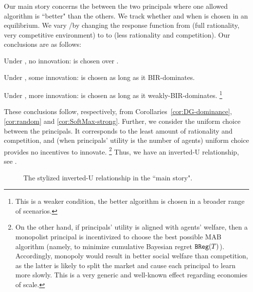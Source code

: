 Our main story concerns the \FiniteGame between the two principals where one allowed algorithm \alg is ``better" than the others. {We track whether and when \alg is chosen in an equilibrium.} We vary \competitiveness/\rationality by changing the response function from \HardMax (full rationality, very competitive environment) to \HardMaxRandom to  \SoftMaxRandom (less rationality and competition). Our conclusions are as follows:
\begin{OneLiners}
\item Under \HardMax, no innovation: \DynGreedy is chosen over \alg.
\item Under \HardMaxRandom, some innovation:  \alg is chosen as long as it BIR-dominates.
\item Under \SoftMaxRandom, more innovation: \alg is chosen as long as it weakly-BIR-dominates.%
\footnote{This is a weaker condition, the better algorithm is chosen in a broader range of scenarios.}
\end{OneLiners}
These conclusions follow, respectively, from Corollaries~\ref{cor:DG-dominance}, \ref{cor:random} and \ref{cor:SoftMax-strong}. Further, {we consider the uniform choice between the principals. It corresponds to the least amount of rationality and competition, and (when principals' utility is the number of agents) uniform choice provides no incentives to innovate.}%
\footnote{On the other hand, if principals' utility is aligned with agents' welfare, then a monopolist principal is incentivized to choose the best possible MAB algorithm (namely, to minimize cumulative Bayesian regret $\mathtt{BReg}(T)$). Accordingly, monopoly would result in better social welfare than competition, as the latter is likely to split the market and cause each principal to learn more slowly. This is a very generic and well-known effect regarding economies of scale.}
Thus, we have an inverted-U relationship, see .


\begin{figure}[t]
\begin{center}

\caption{The stylized inverted-U relationship in the ``main story".}
\label{fig:inverted-U2}
\end{center}
\end{figure}

